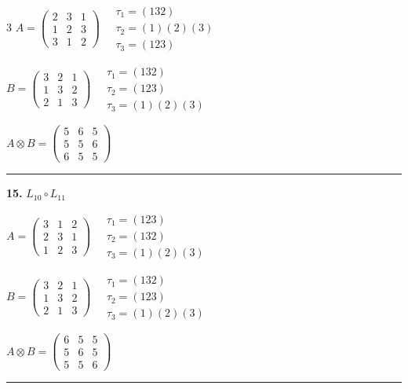 \begin{multicols}{3}
$A = \begin{pmatrix} 2 & 3 & 1 \\ 1 & 2 & 3 \\ 3 & 1 & 2 \end{pmatrix} \quad \begin{matrix} \tau_{1}=(1 3 2) \\ \tau_{2}=(1)(2)(3) \\ \tau_{3}=(1 2 3) \end{matrix}$

$B = \begin{pmatrix} 3 & 2 & 1 \\ 1 & 3 & 2 \\ 2 & 1 & 3 \end{pmatrix} \quad \begin{matrix} \tau_{1}=(1 3 2) \\ \tau_{2}=(1 2 3) \\ \tau_{3}=(1)(2)(3) \end{matrix}$

$A \otimes B = \begin{pmatrix} 5 & 6 & 5 \\ 5 & 5 & 6 \\ 6 & 5 & 5 \end{pmatrix}$

\vspace{0.3em}
\hrule
\vspace{0.3em}

\noindent\textbf{15.} $L_{10} \circ L_{11}$

$A = \begin{pmatrix} 3 & 1 & 2 \\ 2 & 3 & 1 \\ 1 & 2 & 3 \end{pmatrix} \quad \begin{matrix} \tau_{1}=(1 2 3) \\ \tau_{2}=(1 3 2) \\ \tau_{3}=(1)(2)(3) \end{matrix}$

$B = \begin{pmatrix} 3 & 2 & 1 \\ 1 & 3 & 2 \\ 2 & 1 & 3 \end{pmatrix} \quad \begin{matrix} \tau_{1}=(1 3 2) \\ \tau_{2}=(1 2 3) \\ \tau_{3}=(1)(2)(3) \end{matrix}$

$A \otimes B = \begin{pmatrix} 6 & 5 & 5 \\ 5 & 6 & 5 \\ 5 & 5 & 6 \end{pmatrix}$

\vspace{0.3em}
\hrule
\vspace{0.3em}

\end{multicols}